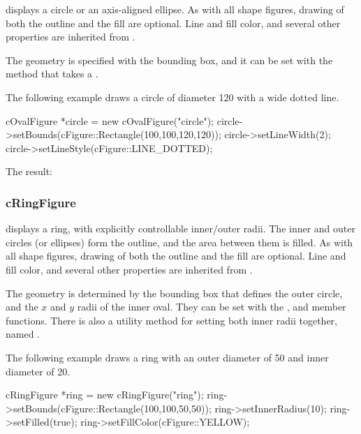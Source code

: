  displays a circle or an axis-aligned ellipse. As with
all shape figures, drawing of both the outline and the fill are optional.
Line and fill color, and several other properties are inherited from
.

The geometry is specified with the bounding box, and it can be set with the
 method that takes a .

The following example draws a circle of diameter 120 with a wide dotted line.

\begin{cpp}
cOvalFigure *circle = new cOvalFigure("circle");
circle->setBounds(cFigure::Rectangle(100,100,120,120));
circle->setLineWidth(2);
circle->setLineStyle(cFigure::LINE_DOTTED);
\end{cpp}


The result:

\begin{center}

\end{center}


\subsubsection{cRingFigure}
\label{sec:graphics:ringfigure}

 displays a ring, with explicitly controllable
inner/outer radii. The inner and outer circles (or ellipses) form the
outline, and the area between them is filled. As with all shape figures,
drawing of both the outline and the fill are optional. Line and fill color,
and several other properties are inherited from
.

The geometry is determined by the bounding box that defines the outer
circle, and the $x$ and $y$ radii of the inner oval. They can be set with
the ,  and 
member functions. There is also a utility method for setting both
inner radii together, named .

The following example draws a ring with an outer diameter of 50 and
inner diameter of 20.

\begin{cpp}
cRingFigure *ring = new cRingFigure("ring");
ring->setBounds(cFigure::Rectangle(100,100,50,50));
ring->setInnerRadius(10);
ring->setFilled(true);
ring->setFillColor(cFigure::YELLOW);
\end{cpp}

